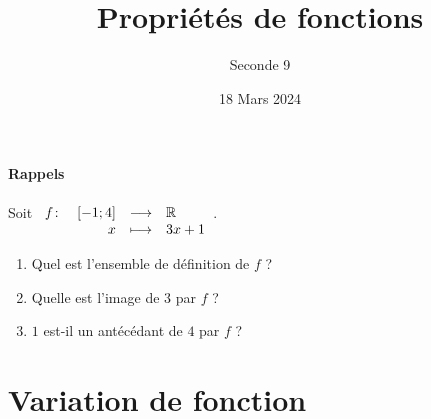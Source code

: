 \documentclass[poly]{mesCours}
\title{Propriétés de fonctions}
\author{Seconde 9}
\date{18 Mars 2024}
\begin{document}
\maketitle
\paragraph{Rappels}
Soit $\begin{array}[t]{lrcl} f\colon & [-1;4] & \longrightarrow & \mathbb{R} \\ & x & \longmapsto & 3x + 1 \end{array}$.
\begin{enumerate}[label=\alph*)]
\item Quel est l'ensemble de définition de $f$ ?
\item Quelle est l'image de $3$ par $f$ ?
\item $1$ est-il un antécédant de $4$ par $f$ ?
\end{enumerate}
\section{Variation de fonction}
\end{document}
